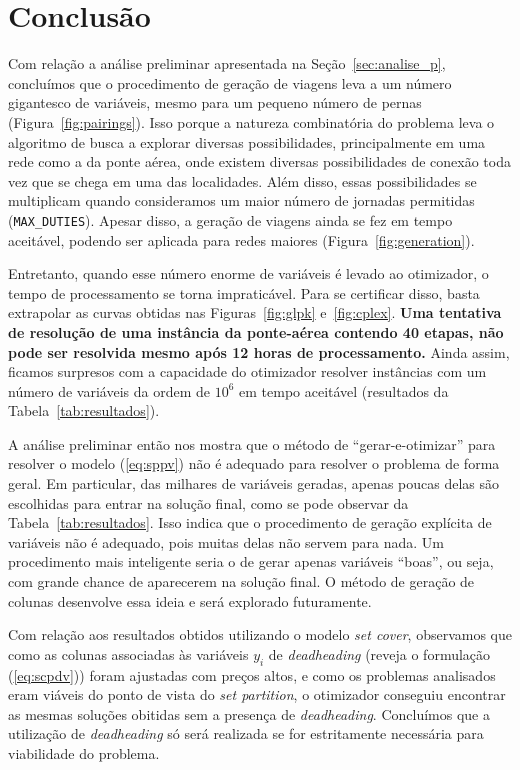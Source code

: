 \zerar
\chapter{Conclusão}
\label{cap:conclusao}

Com relação a análise preliminar apresentada na Seção~\ref{sec:analise_p}, concluímos que o
procedimento de geração de viagens leva a um número gigantesco de variáveis, mesmo para um pequeno
número de pernas (Figura~\ref{fig:pairings}). Isso porque a natureza combinatória do problema leva o
algoritmo de busca a explorar diversas possibilidades, principalmente em uma rede como a da ponte
aérea, onde existem diversas possibilidades de conexão toda vez que se chega em uma das localidades.
Além disso, essas possibilidades se multiplicam quando consideramos um maior número de jornadas
permitidas (\verb|MAX_DUTIES|). Apesar disso, a geração de viagens ainda se fez em tempo aceitável,
podendo ser aplicada para redes maiores (Figura~\ref{fig:generation}).

Entretanto, quando esse número enorme de variáveis é levado ao otimizador, o tempo de processamento
se torna impraticável. Para se certificar disso, basta extrapolar as curvas obtidas nas
Figuras~\ref{fig:glpk} e~\ref{fig:cplex}. {\bf Uma tentativa de resolução de uma instância da
ponte-aérea contendo 40 etapas, não pode ser resolvida mesmo após 12 horas de processamento.} Ainda
assim, ficamos surpresos com a capacidade do otimizador resolver instâncias com um número de
variáveis da ordem de $10^6$ em tempo aceitável (resultados da Tabela~\ref{tab:resultados}).

A análise preliminar então nos mostra que o método de ``gerar-e-otimizar'' para resolver o modelo
(\ref{eq:sppv}) não é adequado para resolver o problema de forma geral. Em particular, das milhares
de variáveis geradas, apenas poucas delas são escolhidas para entrar na solução final, como se pode
observar da Tabela~\ref{tab:resultados}. Isso indica que o procedimento de geração explícita de 
variáveis não é adequado, pois muitas delas não servem para nada. Um procedimento mais inteligente
seria o de gerar apenas variáveis ``boas'', ou seja, com grande chance de aparecerem na solução 
final. O método de geração de colunas desenvolve essa ideia e será explorado futuramente.

Com relação aos resultados obtidos utilizando o modelo {\it set cover}, observamos que como as 
colunas associadas às variáveis $y_i$ de {\it deadheading} (reveja o formulação (\ref{eq:scpdv})) 
foram ajustadas com preços altos, e como os problemas analisados eram viáveis do ponto de vista do 
{\it set partition}, o otimizador conseguiu encontrar as mesmas soluções obitidas sem a presença de 
{\it deadheading}. Concluímos que a utilização de {\it deadheading} só será realizada se for 
estritamente necessária para viabilidade do problema.

